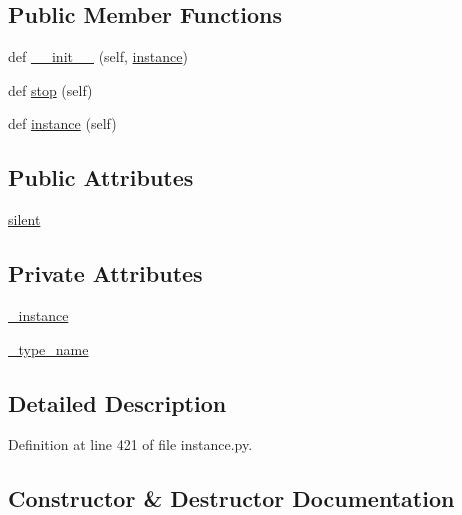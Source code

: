 \subsection*{Public Member Functions}
\begin{DoxyCompactItemize}
\item 
def \hyperlink{classmemoryoracle_1_1instance_1_1InstanceWatcher_abe6bfa583c02408c5d9b4f1ba3a943c0}{\+\_\+\+\_\+init\+\_\+\+\_\+} (self, \hyperlink{classmemoryoracle_1_1instance_1_1InstanceWatcher_a80c73a0d5b32d62848c3df462ff83dcd}{instance})
\item 
def \hyperlink{classmemoryoracle_1_1instance_1_1InstanceWatcher_a1dfaed2006ecf495ede2ab638de9f7db}{stop} (self)
\item 
def \hyperlink{classmemoryoracle_1_1instance_1_1InstanceWatcher_a80c73a0d5b32d62848c3df462ff83dcd}{instance} (self)
\end{DoxyCompactItemize}
\subsection*{Public Attributes}
\begin{DoxyCompactItemize}
\item 
\hyperlink{classmemoryoracle_1_1instance_1_1InstanceWatcher_a483405128108db3465d423107be47589}{silent}
\end{DoxyCompactItemize}
\subsection*{Private Attributes}
\begin{DoxyCompactItemize}
\item 
\hyperlink{classmemoryoracle_1_1instance_1_1InstanceWatcher_a01830207137ed5f292f0ca46a669a05e}{\+\_\+instance}
\item 
\hyperlink{classmemoryoracle_1_1instance_1_1InstanceWatcher_aab7d06a6fb4e5029e13fa851b57bb7a6}{\+\_\+type\+\_\+name}
\end{DoxyCompactItemize}


\subsection{Detailed Description}


Definition at line 421 of file instance.\+py.



\subsection{Constructor \& Destructor Documentation}
\hypertarget{classmemoryoracle_1_1instance_1_1InstanceWatcher_abe6bfa583c02408c5d9b4f1ba3a943c0}{}
